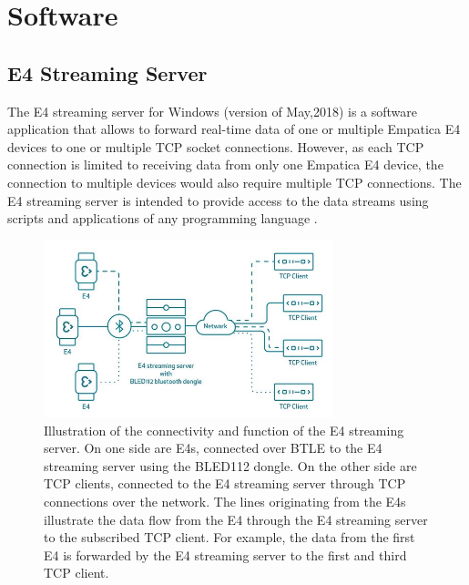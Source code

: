 \section{Software}
\subsection{E4 Streaming Server}
The E4 streaming server for Windows (version of May,2018) is a software application that allows to forward real-time data of one or multiple Empatica E4 devices to one or multiple TCP socket connections. However, as each TCP connection is limited to receiving data from only one Empatica E4 device, the connection to multiple devices would also require multiple TCP connections. The E4 streaming server is intended to provide access to the data streams using scripts and applications of any programming language \cite{E4SS}.\\

\begin{figure}[ht]
	\centering
  \includegraphics[width=0.75\textwidth]{images/E4streamingServer.JPG}
	\caption[E4 streaming server: connectivity and function]{Illustration of the connectivity and function of the E4 streaming server. On one side are E4s, connected over BTLE to the E4 streaming server using the BLED112 dongle. On the other side are TCP clients, connected to the E4 streaming server through TCP connections over the network. The lines originating from the E4s illustrate the data flow from the E4 through the E4 streaming server to the subscribed TCP client. For example, the data from the first E4 is forwarded by the E4 streaming server to the first and third TCP client. \cite{E4SS}}
	\label{e4ss}
\end{figure}

